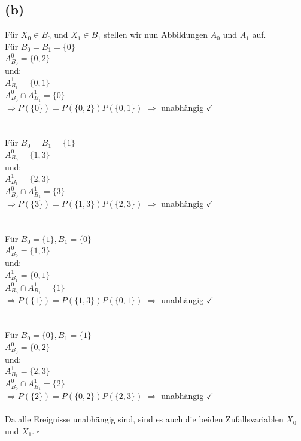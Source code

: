 \documentclass[a4paper]{scrartcl}
\begin{document}
\subsection*{(b)}
Für $X_0 \in B_0$ und $X_1 \in B_1$ stellen wir nun Abbildungen $A_0$ und $A_1$ auf.\\
Für $B_0 = B_1 = \lbrace 0 \rbrace$\\
$A^0_{B_0} = \lbrace 0, 2 \rbrace$\\
und: \\
$A^1_{B_1} = \lbrace 0,1 \rbrace$\\
$A^0_{B_0} \cap A^1_{B_1} = \lbrace 0 \rbrace$\\
$\Rightarrow P(\lbrace 0 \rbrace) = P(\lbrace 0,2 \rbrace)P(\lbrace 0,1 \rbrace)$
$\Rightarrow$ unabhängig $\checkmark$
\\
\\
\\
Für $B_0 = B_1 = \lbrace 1 \rbrace$\\
$A^0_{B_0} = \lbrace 1,3 \rbrace$\\
und: \\
$A^1_{B_1} = \lbrace 2,3 \rbrace$\\
$A^0_{B_0} \cap A^1_{B_1} = \lbrace 3 \rbrace$\\
$\Rightarrow P(\lbrace 3 \rbrace) = P(\lbrace 1,3 \rbrace)P(\lbrace 2,3 \rbrace)$
$\Rightarrow$ unabhängig $\checkmark$
\\
\\
\\
Für $B_0 = \lbrace 1 \rbrace , B_1 = \lbrace 0 \rbrace$\\
$A^0_{B_0} = \lbrace 1,3 \rbrace$\\
und: \\
$A^1_{B_1} = \lbrace 0,1 \rbrace$\\
$A^0_{B_0} \cap A^1_{B_1} = \lbrace 1 \rbrace$\\
$\Rightarrow P(\lbrace 1 \rbrace) = P(\lbrace 1,3 \rbrace)P(\lbrace 0,1 \rbrace)$
$\Rightarrow$ unabhängig $\checkmark$
\\
\\
\\
Für $B_0 = \lbrace 0 \rbrace , B_1 = \lbrace 1 \rbrace$\\
$A^0_{B_0} = \lbrace 0,2 \rbrace$\\
und: \\
$A^1_{B_1} = \lbrace 2,3 \rbrace$\\
$A^0_{B_0} \cap A^1_{B_1} = \lbrace 2 \rbrace$\\
$\Rightarrow P(\lbrace 2 \rbrace) = P(\lbrace 0,2 \rbrace)P(\lbrace 2,3 \rbrace)$
$\Rightarrow$ unabhängig $\checkmark$\\
\\
Da alle Ereignisse unabhängig sind, sind es auch die beiden Zufallsvariablen $X_0$ und $X_1$. $\square$
\end{document}
